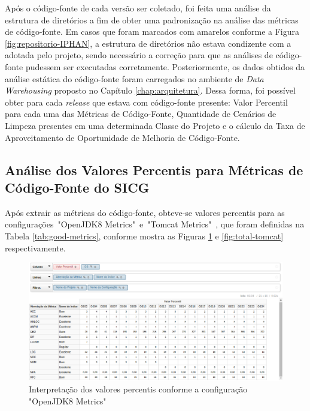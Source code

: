 Após o código-fonte de cada versão ser coletado, foi feita uma análise da estrutura de diretórios a fim de obter uma padronização na análise das métricas de código-fonte. Em casos que foram marcados com amarelos conforme a Figura \ref{fig:repositorio-IPHAN}, a estrutura de diretórios não estava condizente com a adotada pelo projeto, sendo necessário a correção para que as análises de código-fonte pudessem ser executadas corretamente. Posteriormente, os dados obtidos da análise estática do código-fonte foram carregados no ambiente de \textit{Data Warehousing} proposto no Capítulo \ref{chap:arquitetura}. Dessa forma, foi possível obter para cada \textit{release} que estava com código-fonte presente: Valor Percentil para cada uma das Métricas de Código-Fonte, Quantidade de Cenários de Limpeza presentes em uma determinada Classe do Projeto e o cálculo da Taxa de Aproveitamento de Oportunidade de Melhoria de Código-Fonte. 


\subsection{Análise dos Valores Percentis para Métricas de Código-Fonte do SICG}
\label{sec:metrics-analisys}

Após extrair as métricas do código-fonte, obteve-se valores percentis para as configurações~"OpenJDK8 Metrics"~e~"Tomcat Metrics"~, que foram definidas na Tabela \ref{tab:good-metrics}, conforme mostra as Figuras \ref{fig:total-openJDK8} e \ref{fig:total-tomcat}   
respectivamente.

\begin{figure}
\centering
\includegraphics[keepaspectratio=true,scale=0.7]{figuras/total-OpenJDK.eps}
\caption{Interpretação dos valores percentis conforme a configuração "OpenJDK8 Metrics"}
\label{fig:total-openJDK8}
\end{figure}
\FloatBarrier

